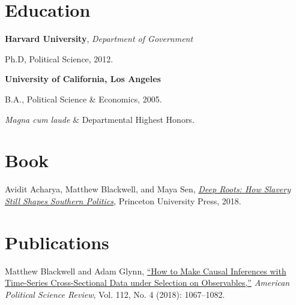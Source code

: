 \documentclass[margin,line,12pt]{res}
\newenvironment{list1}{
  \begin{list}{\ding{113}}{%
      \setlength{\itemsep}{0in}
      \setlength{\parsep}{0in} \setlength{\parskip}{0in}
      \setlength{\topsep}{0in} \setlength{\partopsep}{0in} 
      \setlength{\leftmargin}{0.83 cm}}}{\end{list}}
\begin{document}
\begin{resume}
\section{\sc Education}

{\bf Harvard University}, {\em Department of Government}
\begin{list1}
\item[] Ph.D, Political Science, 2012. 
\end{list1}
{\bf University of California, Los Angeles}
\begin{list1}
\item[] B.A., Political Science \& Economics, 2005.
\item[] \emph{Magna cum laude} \& Departmental Highest Honors.
\end{list1}

\section{\sc Book}

Avidit Acharya, Matthew Blackwell, and Maya Sen, \href{http://www.mattblackwell.org/deep-roots/}{\emph{Deep Roots: How Slavery Still Shapes Southern Politics}}, Princeton University Press, 2018.

\section{\sc Publications}
Matthew Blackwell and Adam Glynn, \href{http://www.mattblackwell.org/files/papers/causal-tscs.pdf}{``How to Make Causal Inferences with Time-Series
  Cross-Sectional Data under Selection on Observables,''} \emph{American Political Science Review}, Vol. 112, No. 4 (2018): 1067--1082.


\end{resume}
\end{document}
